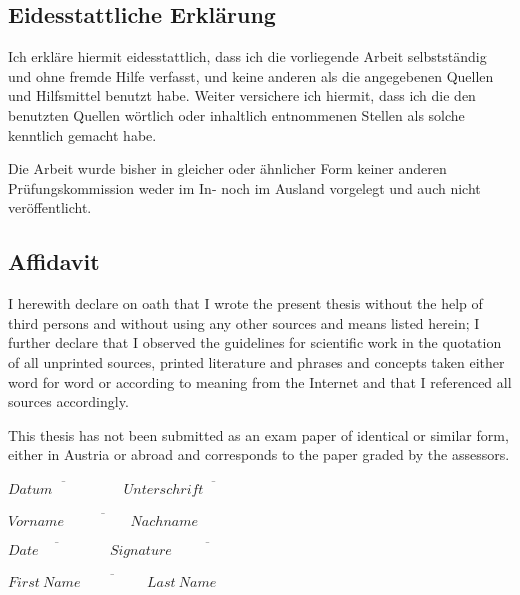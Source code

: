 
\ifmmtlanguagegerman
\subsection*{Eidesstattliche Erklärung}


Ich erkläre hiermit eidesstattlich, dass  ich  die vorliegende Arbeit selbstständig  und ohne fremde Hilfe verfasst, und keine  anderen  als die angegebenen Quellen und  Hilfsmittel benutzt  habe. Weiter versichere ich hiermit, dass ich   die den benutzten Quellen  wörtlich oder inhaltlich entnommenen Stellen als solche kenntlich gemacht habe.

Die Arbeit wurde bisher in gleicher oder ähnlicher Form keiner anderen Prüfungskommission weder im In- noch im Ausland vorgelegt und auch nicht veröffentlicht.

\else

\subsection*{Affidavit}

I herewith declare on oath that I wrote the present thesis without the help of third persons and without using any other sources and means listed herein; I further declare that I observed the guidelines for scientific work in the quotation of all unprinted sources, printed literature and phrases and concepts taken either word for word or according to meaning from the Internet and that I referenced all sources accordingly.

This thesis has not been submitted as an exam paper of identical or similar form, either in Austria or abroad and corresponds to the paper graded by the assessors.

\fi

\vspace*{3cm}



\hfill

\ifmmtlanguagegerman
$\overline{Datum \hspace{2cm}}$ \hfill $\overline{{Unterschrift}\hspace{3cm}}$

\vspace*{1cm}

\hfill $\overline{{Vorname\hspace{2cm}Nachname}}$
 
 \else
 $\overline{Date \hspace{2cm}}$ \hfill $\overline{{Signature}\hspace{4cm}}$

\vspace*{1cm}

 \hfill $\overline{{First~Name\hspace{2cm}Last~Name}}$
 \fi

